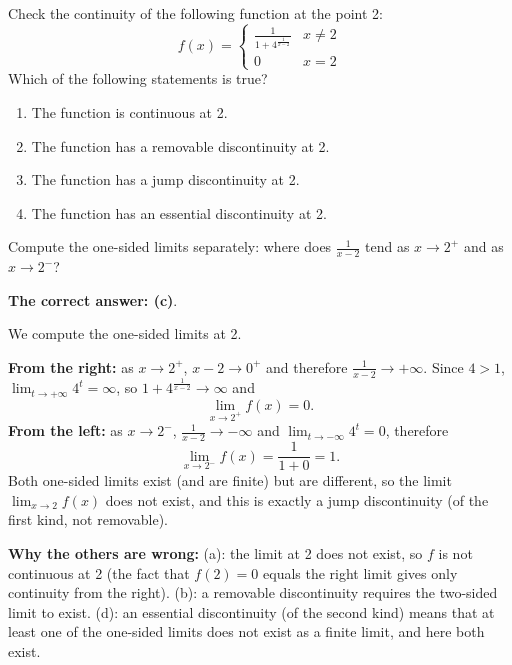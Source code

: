 
\begin{question}
Check the continuity of the following function at the point 2:
\[
f(x)=\begin{cases}
\frac{1}{1+4^{\frac{1}{x-2}}} & x\neq 2\\
0 & x=2
\end{cases}
\]
Which of the following statements is true?
\begin{enumerate}
  \item The function is continuous at 2.
  \item The function has a removable discontinuity at 2.
  \item The function has a jump discontinuity at 2.
  \item The function has an essential discontinuity at 2.
\end{enumerate}
\end{question}

\begin{hint}
Compute the one-sided limits separately: where does $\frac{1}{x-2}$ tend as $x\to2^+$ and as $x\to2^-$?
\end{hint}

\begin{solution}
\textbf{The correct answer: (c)}.

We compute the one-sided limits at 2.

\textbf{From the right:} as $x\to2^+$, $x-2\to0^+$ and therefore $\frac1{x-2}\to+\infty$. Since $4>1$, $\lim_{t\to+\infty}4^t=\infty$, so $1+4^{\frac{1}{x-2}}\to\infty$ and
\[
\lim_{x\to2^+}f(x)=0 .
\]
\textbf{From the left:} as $x\to2^-$, $\frac1{x-2}\to-\infty$ and $\lim_{t\to-\infty}4^t=0$, therefore
\[
\lim_{x\to2^-}f(x)=\frac{1}{1+0}=1 .
\]
Both one-sided limits exist (and are finite) but are different, so the limit $\lim_{x\to2}f(x)$ does not exist, and this is exactly a jump discontinuity (of the first kind, not removable).

\textbf{Why the others are wrong:} (a): the limit at 2 does not exist, so $f$ is not continuous at 2 (the fact that $f(2)=0$ equals the right limit gives only continuity from the right). (b): a removable discontinuity requires the two-sided limit to exist. (d): an essential discontinuity (of the second kind) means that at least one of the one-sided limits does not exist as a finite limit, and here both exist.
\end{solution}
